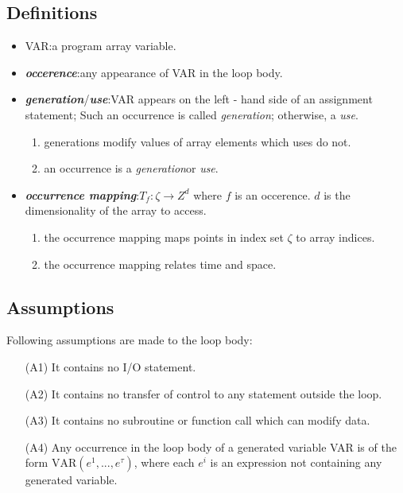 \subsection {Definitions}

\begin{itemize}
  \item VAR:a program array variable.
  \item \textbf {\textit {occerence}}:any appearance of VAR in the loop body.
  \item \textbf {\textit {generation}}/\textbf {\textit {use}}:VAR appears on the left - hand side of an assignment statement;
  Such an occurrence is called \textit {generation}; otherwise, a \textit {use}.
  \begin{enumerate}
    \item generations modify values of array elements which uses do not.
    \item an occurrence is a \textit {generation}or \textit {use}.
  \end{enumerate}
  \item \textbf {\textit {occurrence mapping}}:$T_f:\zeta \rightarrow Z^d$ where $f$ is
  an occerence. $d$ is the dimensionality of the array to access.
  \begin{enumerate}
    \item the occurrence mapping maps points in index set $\zeta$ to array indices.
    \item the occurrence mapping relates time and space.
  \end{enumerate}
\end {itemize}

\subsection {Assumptions}

Following assumptions are made to the loop body:
\begin {itemize}
\item [(A1)] It contains no I/O statement.
\item [(A2)] It contains no transfer of control to any statement outside the loop.
\item [(A3)] It contains no subroutine or function call which can modify data.
\item [(A4)] Any occurrence in the loop body of a generated variable VAR is of the
form $\text {VAR}(e^1, ..., e^\tau)$, where each $e^i$ is an expression not containing any
generated variable.
\end {itemize}

